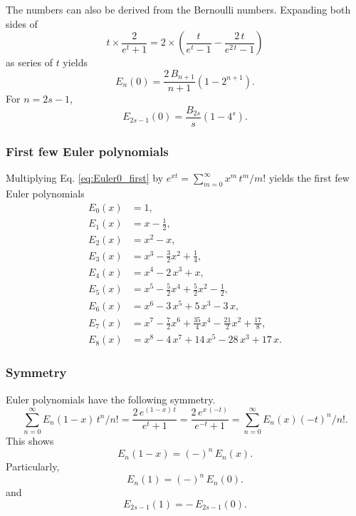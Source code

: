 \documentclass[aip,jcp,preprint,notitlepage, superscriptaddress]{revtex4-1}
\begin{document}
The numbers can also be derived from the Bernoulli numbers.
%
Expanding both sides of
\[
t \times \frac{ 2 }{ e^t + 1}
=
2 \times \left(
  \frac{ t }{ e^t - 1 }
  -
  \frac{ 2 \, t } { e^{2 \, t} - 1 }
\right)
\]
as series of $t$ yields
\[
E_n(0)
=
\frac{ 2 \, B_{n + 1} } { n + 1 }
\left( 1 - 2^{n + 1} \right).
\]
%
For $n = 2 s - 1$,
\[
E_{2 s - 1}(0)
=
\frac{ B_{2 s} } { s }
\left( 1 - 4^s \right).
\]



\subsubsection{First few Euler polynomials}




Multiplying Eq. \eqref{eq:Euler0_first}
by $e^{x t} = \sum_{m = 0}^\infty x^m \, t^m/m!$ yields
the first few Euler polynomials\cite{
abramowitz, wang_specfunc}
\begin{align*}
  E_0(x) &= 1, \\
  E_1(x) &= x -\frac 1 2, \\
  E_2(x) &= x^2 - x, \\
  E_3(x) &= x^3 - \frac 3 2 x^2 + \frac 1 4, \\
  E_4(x) &= x^4 - 2 \, x^3  + x, \\
  E_5(x) &= x^5 - \frac 5 2 x^4 + \frac 5 2 x^2 -\frac 1 2, \\
  E_6(x) &= x^6 - 3 \, x^5 + 5 \, x^3 - 3 \, x, \\
  E_7(x) &= x^7 - \frac 7 2 x^6 + \frac{35}{4} x^4 - \frac{21}{2} x^2 + \frac{ 17 } 8, \\
  E_8(x) &= x^8 - 4 \, x^7 + 14 \, x^5 - 28 \, x^3 + 17 \, x.
\end{align*}



\subsubsection{Symmetry}



Euler polynomials have the following symmetry.
%
\begin{equation*}
\sum_{n = 0}^\infty
E_n(1 - x) \, t^n/n!
=
\frac{ 2 \, e^{(1 - x) \, t} }
{ e^t + 1 }
=
\frac{ 2 \, e^{ x \, (-t)} }
{ e^{-t} + 1 }
=
\sum_{n = 0}^\infty
E_n(x) (-t)^n / n!.
\end{equation*}
%
This shows
\[
E_n(1 - x) = (-)^n \, E_n(x).
\]
Particularly,
\[
E_n(1) = (-)^n \, E_n(0).
\]
and
\begin{equation}
E_{2s - 1}(1) = - \, E_{2s - 1}(0).
\label{eq:Euler1_odd}
\end{equation}
\end{document}
